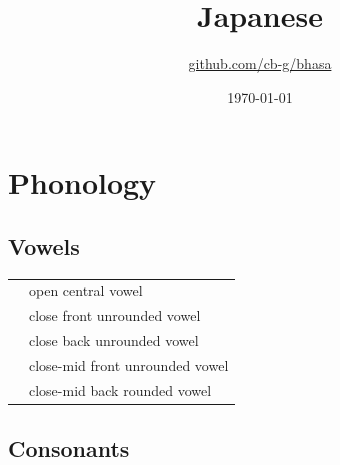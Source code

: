 \documentclass{article}
\title{Japanese\\\ipa{[NihoNgo]}}
\author{\href{https://github.com/cb-g/bhasa}{github.com/cb-g/bhasa}}
\date{\today}
\begin{document}
\pagecolor{custom_bg}\color{custom_fg}
\maketitle\thispagestyle{empty}

\newpage\setcounter{page}{1}\section{Phonology}

\subsection{Vowels}

\begin{xltabular}{\textwidth}{lL}
   & open central vowel \\
   & close front unrounded vowel \\
  \ipa{\textturnm} & close back unrounded vowel \\
   & close-mid front unrounded vowel \\
   & close-mid back rounded vowel \\
\end{xltabular}

\subsection{Consonants}
\end{document}
